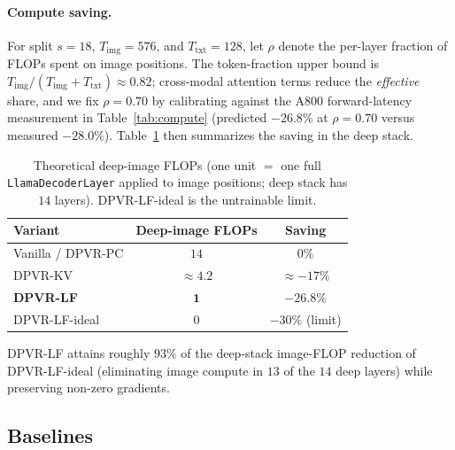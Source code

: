 \documentclass[a4paper,fleqn,review]{cas-sc}
\newcommand{\dpvrlf}{DPVR-LF}
\newcommand{\dpvrpc}{DPVR-PC}
\newcommand{\dpvrkv}{DPVR-KV}
\newcommand{\dpvrlfideal}{DPVR-LF-ideal}
\begin{document}
\paragraph{Compute saving.}
For split $s = 18$, $T_{\mathrm{img}} = 576$, and $T_{\mathrm{txt}} = 128$,
let $\rho$ denote the per-layer fraction of FLOPs spent on image
positions. The token-fraction upper bound is
$T_{\mathrm{img}} / (T_{\mathrm{img}} + T_{\mathrm{txt}}) \approx 0.82$;
cross-modal attention terms reduce the \emph{effective} share, and we
fix $\rho = 0.70$ by calibrating against the A800 forward-latency
measurement in Table~\ref{tab:compute} (predicted $-26.8\%$ at
$\rho = 0.70$ versus measured $-28.0\%$).
Table~\ref{tab:compute-est} then summarizes the saving in the deep stack.

\begin{table}[t]
\centering
\caption{Theoretical deep-image FLOPs (one unit $=$ one full
\texttt{LlamaDecoderLayer} applied to image positions; deep stack
has $14$ layers). \dpvrlfideal{} is the untrainable limit.}
\label{tab:compute-est}
\footnotesize
\setlength{\tabcolsep}{4pt}
\begin{tabular}{lcc}
\toprule
Variant & Deep-image FLOPs & Saving \\
\midrule
Vanilla / \dpvrpc{}     & $14$        & $0\%$            \\
\dpvrkv{}               & $\approx 4.2$ & $\approx -17\%$  \\
\textbf{\dpvrlf{}}      & $\bm{1}$    & $\bm{-26.8\%}$   \\
\dpvrlfideal{}          & $0$         & $-30\%$ (limit)  \\
\bottomrule
\end{tabular}
\end{table}

\dpvrlf{} attains roughly $93\%$ of the deep-stack image-FLOP
reduction of \dpvrlfideal{} (eliminating image compute in $13$ of the
$14$ deep layers) while preserving non-zero gradients.

\subsection{Baselines}\label{sec:method-baselines}
\end{document}
